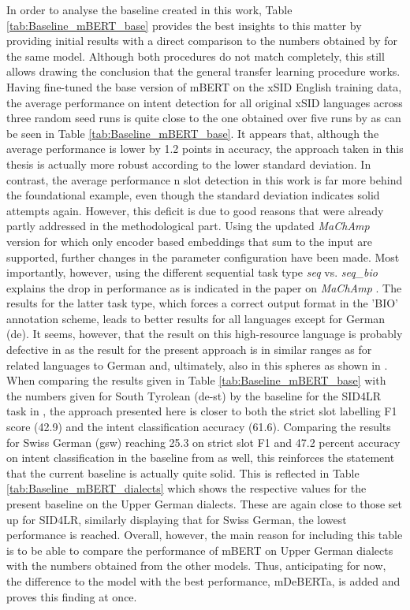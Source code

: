 \documentclass[11pt,a4paper,twoside,openright]{scrbook}
\begin{document}
In order to analyse the baseline created in this work, Table \ref{tab:Baseline_mBERT_base} provides the best insights to this matter by providing initial results with a direct comparison to the numbers obtained by \citet{van-der-goot-etal-2021-masked} for the same model. Although both procedures do not match completely, this still allows drawing the conclusion that the general transfer learning procedure works. Having fine-tuned the base version of mBERT \citep{devlin-etal-2019-bert} on the xSID English training data, the average performance on intent detection for all original xSID languages across three random seed runs is quite close to the one obtained over five runs by \citet{van-der-goot-etal-2021-masked} as can be seen in Table \ref{tab:Baseline_mBERT_base}. It appears that, although the average performance is lower by 1.2 points in accuracy, the approach taken in this thesis is actually more robust according to the lower standard deviation. In contrast, the average performance n slot detection in this work is far more behind the foundational example, even though the standard deviation indicates solid attempts again. However, this deficit is due to good reasons that were already partly addressed in the methodological part. Using the updated \textit{MaChAmp} version for which only encoder based embeddings that sum to the input are supported, further changes in the parameter configuration have been made. Most importantly, however, using the different sequential task type \textit{seq} vs. \textit{seq\_bio} explains the drop in performance as is indicated in the paper on \textit{MaChAmp} \citep{van-der-goot-etal-2021-massive}. The results for the latter task type, which forces a correct output format in the 'BIO' annotation scheme, leads to better results for all languages except for German (de). It seems, however, that the result on this high-resource language is probably defective in \citet{van-der-goot-etal-2021-masked} as the result for the present approach is in similar ranges as for related languages to German and, ultimately, also in this spheres as shown in \citet{winkler-etal-2024-slot-intent}. When comparing the results given in Table \ref{tab:Baseline_mBERT_base} with the numbers given for South Tyrolean (de-st) by the baseline for the SID4LR task in \citet{2023-findings-vardial}, the approach presented here is closer to both the strict slot labelling F1 score (42.9) and the intent classification accuracy (61.6). Comparing the results for Swiss German (gsw) reaching 25.3 on strict slot F1 and 47.2 percent accuracy on intent classification in the baseline from \citet{2023-findings-vardial} as well, this reinforces the statement that the current baseline is actually quite solid. This is reflected in Table \ref{tab:Baseline_mBERT_dialects} which shows the respective values for the present baseline on the Upper German dialects. These are again close to those set up for SID4LR, similarly displaying that for Swiss German, the lowest performance is reached. Overall, however, the main reason for including this table is to be able to compare the performance of mBERT on Upper German dialects with the numbers obtained from the other models. Thus, anticipating for now, the difference to the model with the best performance, mDeBERTa, is added and proves this finding at once.
\end{document}
